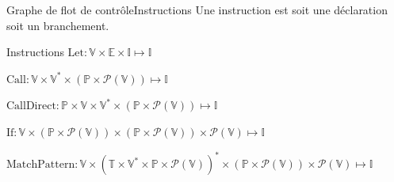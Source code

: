 \documentclass{beamer}
\begin{document}
\begin{frame}{Graphe de flot de contrôle}{Instructions}
    Une instruction est soit une déclaration soit un branchement.%
    
    \begin{block}{Instructions}
        $\text{Let} : \mathbb{V} \times \mathbb{E} \times \mathbb{I} \mapsto \mathbb{I}$%

        $\text{Call} : \mathbb{V} \times \mathbb{V}^{*} \times \left( \mathbb{P} \times \mathcal{P}(\mathbb{V}) \right) \mapsto \mathbb{I}$%

        $\text{CallDirect} : \mathbb{P} \times \mathbb{V} \times \mathbb{V}^{*} \times \left( \mathbb{P} \times \mathcal{P}(\mathbb{V}) \right) \mapsto \mathbb{I}$%

        $\text{If} : \mathbb{V} \times (\mathbb{P} \times \mathcal{P}(\mathbb{V})) \times (\mathbb{P} \times \mathcal{P}(\mathbb{V})) \times \mathcal{P}(\mathbb{V}) \mapsto \mathbb{I}$%

        $\text{MatchPattern} : \mathbb{V} \times (\mathbb{T} \times \mathbb{V}^{*} \times \mathbb{P} \times \mathcal{P}(\mathbb{V}))^{*} \times (\mathbb{P} \times \mathcal{P}(\mathbb{V})) \times \mathcal{P}(\mathbb{V}) \mapsto \mathbb{I}$%


\end{block}
\end{frame}
\end{document}
